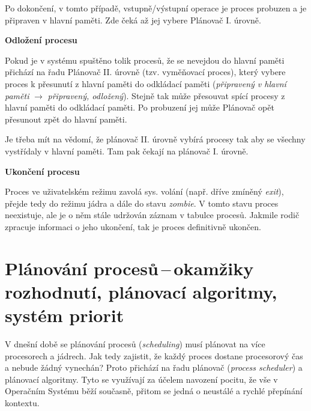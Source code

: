 Po dokončení, v tomto případě, vstupně/výstupní operace je proces probuzen a je připraven v hlavní paměti. Zde čeká až jej vybere Plánovač I. úrovně. 

\begin{large}
    \vspace{0,5cm}
    \textbf{Odložení procesu}
\end{large}

Pokud je v systému spuštěno tolik procesů, že se nevejdou do hlavní paměti přichází na řadu Plánovač II. úrovně (tzv. vyměňovací proces), který vybere proces k přesunutí z hlavní paměti do odkládací paměti (\textit{připravený v hlavní paměti} $\xrightarrow{}$ \textit{připravený, odložený}). Stejně tak může přesouvat spící procesy z hlavní paměti do odkládací paměti. Po probuzení jej může Plánovač opět přesunout zpět do hlavní paměti.

\vspace{0,5cm}

Je třeba mít na vědomí, že plánovač II. úrovně vybírá procesy tak aby se všechny vystřídaly v hlavní paměti. Tam pak čekají na plánovač I. úrovně. 

\begin{large}
    \vspace{0,5cm}
    \textbf{Ukončení procesu}
\end{large}

Proces ve uživatelském režimu zavolá sys. volání (např. dříve zmíněný \textit{exit}), přejde tedy do režimu jádra a dále do stavu \textit{zombie}. V tomto stavu proces neexistuje, ale je o něm stále udržován záznam v tabulce procesů. Jakmile rodič zpracuje informaci o jeho ukončení, tak je proces definitivně ukončen. 


\newpage
\section{Plánování procesů\,--\,okamžiky rozhodnutí, plánovací algoritmy, systém priorit} \label{planning}

V dnešní době se plánování procesů (\textit{scheduling}) musí plánovat na více procesorech a jádrech. Jak tedy zajistit, že každý proces dostane procesorový čas a nebude žádný vynechán? Proto přichází na řadu plánovač (\textit{process scheduler}) a plánovací algoritmy. Tyto se využívají za účelem navození pocitu, že vše v Operačním Systému běží současně, přitom se jedná o neustálé a rychlé přepínání kontextu.

